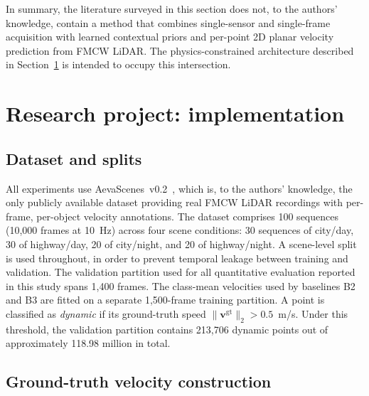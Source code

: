 \documentclass[a4paper,12pt]{article}
\begin{document}
In summary, the literature surveyed in this section does not, to the authors' knowledge, contain a method that combines single-sensor and single-frame acquisition with learned contextual priors and per-point 2D planar velocity prediction from FMCW LiDAR. The physics-constrained architecture described in Section~\ref{Implementation} is intended to occupy this intersection.


\newpage

%

\section{Research project: implementation}
\label{Implementation}

\subsection{Dataset and splits}
\label{DatasetSplits}

All experiments use AevaScenes~v0.2~\cite{aeva2025aevascenes}, which is, to the authors' knowledge, the only publicly available dataset providing real FMCW LiDAR recordings with per-frame, per-object velocity annotations. The dataset comprises 100 sequences (10{,}000 frames at 10~Hz) across four scene conditions: 30 sequences of city/day, 30 of highway/day, 20 of city/night, and 20 of highway/night. A scene-level split is used throughout, in order to prevent temporal leakage between training and validation. The validation partition used for all quantitative evaluation reported in this study spans 1{,}400 frames. The class-mean velocities used by baselines B2 and B3 are fitted on a separate 1{,}500-frame training partition. A point is classified as \emph{dynamic} if its ground-truth speed $\|\mathbf{v}^{\mathrm{gt}}\|_2 > 0.5$~m/s. Under this threshold, the validation partition contains 213{,}706 dynamic points out of approximately 118.98 million in total.

\subsection{Ground-truth velocity construction}
\label{GTVelocity}
\end{document}
